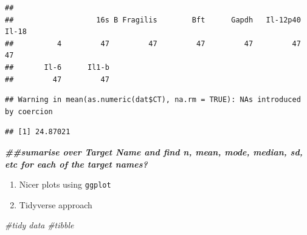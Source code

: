 \documentclass[
]{book}
\newenvironment{Shaded}{\begin{snugshade}}{\end{snugshade}}
\newcommand{\AttributeTok}[1]{\textcolor[rgb]{0.77,0.63,0.00}{#1}}
\newcommand{\CommentTok}[1]{\textcolor[rgb]{0.56,0.35,0.01}{\textit{#1}}}
\newcommand{\ConstantTok}[1]{\textcolor[rgb]{0.00,0.00,0.00}{#1}}
\newcommand{\DocumentationTok}[1]{\textcolor[rgb]{0.56,0.35,0.01}{\textbf{\textit{#1}}}}
\newcommand{\FunctionTok}[1]{\textcolor[rgb]{0.00,0.00,0.00}{#1}}
\newcommand{\NormalTok}[1]{#1}
\newcommand{\SpecialCharTok}[1]{\textcolor[rgb]{0.00,0.00,0.00}{#1}}
\begin{document}
\begin{Shaded}
\end{Shaded}

\begin{verbatim}
## 
##                   16s B Fragilis        Bft      Gapdh   Il-12p40      Il-18 
##          4         47         47         47         47         47         47 
##       Il-6      Il1-b 
##         47         47
\end{verbatim}

\begin{Shaded}
\end{Shaded}

\begin{verbatim}
## Warning in mean(as.numeric(dat$CT), na.rm = TRUE): NAs introduced by coercion
\end{verbatim}

\begin{verbatim}
## [1] 24.87021
\end{verbatim}

\begin{Shaded}
\begin{Highlighting}[]
\DocumentationTok{\#\#sumarise over Target Name and find n, mean, mode, median, sd, etc for each of the target names?}
\end{Highlighting}
\end{Shaded}

\begin{enumerate}
\def\labelenumi{\arabic{enumi}.}
\setcounter{enumi}{5}
\item
  Nicer plots using \texttt{ggplot}
\item
  Tidyverse approach
\end{enumerate}

\begin{Shaded}
\begin{Highlighting}[]
\CommentTok{\#tidy data}
\CommentTok{\#tibble}
\end{Highlighting}
\end{Shaded}
\end{document}
